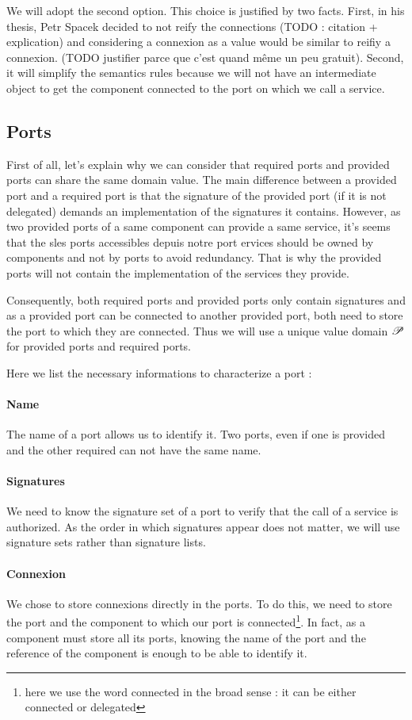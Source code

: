 We will adopt the second option. This choice is justified by two facts. First, in his thesis, Petr Spacek decided to not reify the connections (TODO : citation + explication) and considering a connexion as a value would be similar to reifiy a connexion. (TODO justifier parce que c'est quand même un peu gratuit).  Second, it will simplify the semantics rules because we will not have an intermediate object to get the component connected to the port on which we call a service.

\subsection{Ports}
\label{value_ports}
First of all, let's explain why we can consider that required ports and provided ports can share the same domain value. The main difference between a provided port and a required port is that the signature of the provided port (if it is not delegated) demands an implementation of the signatures it contains. However, as two provided ports of a same component can provide a same service, it's seems that the sles ports accessibles depuis notre port ervices should be owned by components and not by ports to avoid redundancy. That is why the provided ports will not contain the implementation of the services they provide. 

Consequently, both required ports and provided ports only contain signatures and as a provided port can be connected to another provided port, both need to store the port to which they are connected. Thus we will use a unique value domain $\mathcal{P}$ for provided ports and required ports.
 

Here we list the necessary informations to characterize a port :
\paragraph{Name} The name of a port allows us to identify it. Two ports, even if one is provided and the other required can not have the same name. 
\paragraph{Signatures} We need to know the signature set of a port to verify that the call of a service is authorized. As the order in which signatures appear does not matter, we will use signature sets rather than signature lists.
\paragraph{Connexion}
We chose to store connexions directly in the ports. To do this, we need to store the port and the component to which our port is connected\footnote{here we use the word connected in the broad sense : it can be either connected or delegated}. In fact, as a component must store all its ports, knowing the name of the port  and the reference of the component is enough to be able to identify it.
